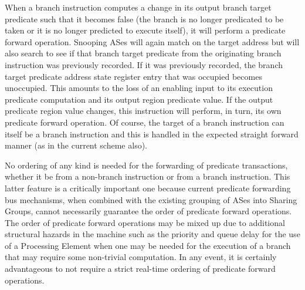 \documentclass[10pt,dvips]{article}
\begin{document}
When a branch instruction computes a change in its output branch
target predicate such that it becomes false (the branch is no longer
predicated to be taken or it is no longer predicted to execute itself),
it will perform a predicate forward operation.  Snooping ASes will
again match on the target address but will also search to see if that
branch target predicate from the originating branch instruction was
previously recorded.  If it was previously recorded, the branch target
predicate address state register entry that was occupied becomes
unoccupied.  This amounts to the loss of an enabling input to its
execution predicate computation and its output region predicate value.  
If the
output predicate region value changes, this instruction will perform,
in turn, its own predicate forward operation.
Of course, the target of a branch instruction can itself be a branch
instruction and this is handled in the expected straight forward manner
(as in the current scheme also).  

No ordering of any kind is
needed for the forwarding of predicate transactions, whether it be from
a non-branch instruction or from a branch instruction.  This latter
feature is a critically important one 
because current predicate forwarding bus mechanisms, when
combined with the existing grouping of ASes into Sharing Groups, cannot
necessarily guarantee the order of predicate forward operations.  The
order of predicate forward operations may be mixed up due to additional
structural hazards in the machine such as the priority and queue delay
for the use of a Processing Element when one may be needed for the
execution of a branch that may require some non-trivial computation.
In any event, it is certainly advantageous to not require a strict
real-time ordering of predicate forward operations.
\end{document}
